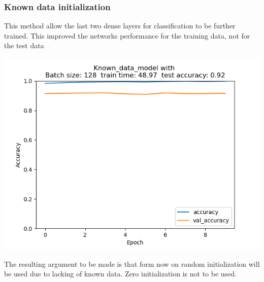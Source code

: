 \documentclass{article}
\newenvironment{Figure}
{\par\medskip\noindent\minipage{\linewidth}}
{\endminipage\par\medskip}
\begin{document}
\begin{multicols}{2}
\subsubsection{Known data initialization}
This method allow the last two dense layers for classification to be further trained. This improved the networks performance for the training data, not for the test data
\begin{Figure}
	\label{fig:known_init}
	\centering
	\includegraphics[width=\linewidth]{../img_1_1_init/acc_plot_Known_data_model}
\end{Figure}

The resulting argument to be made is that form now on random initialization will be used due to lacking of known data. Zero initialization is not to be used.


\end{multicols}
\end{document}
